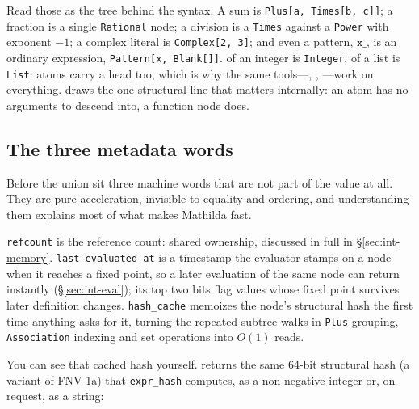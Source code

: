 
Read those as the tree behind the syntax. A sum is \texttt{Plus[a, Times[b, c]]}; a
fraction is a single \texttt{Rational} node; a division is a \texttt{Times} against a
\texttt{Power} with exponent \(-1\); a complex literal is \texttt{Complex[2, 3]}; and
even a pattern, \(\mathtt{x\_}\), is an ordinary expression,
\texttt{Pattern[x, Blank[]]}.  of an integer is \texttt{Integer}, of a list
is \texttt{List}: atoms carry a head too, which is why the same tools---,
, ---work on everything.  draws the one structural line
that matters internally: an atom has no arguments to descend into, a function node
does.

\subsection*{The three metadata words}

Before the union sit three machine words that are not part of the value at all. They
are pure acceleration, invisible to equality and ordering, and understanding them
explains most of what makes Mathilda fast.

\texttt{refcount} is the reference count: shared ownership, discussed in full in
\S\ref{sec:int-memory}. \texttt{last\_evaluated\_at} is a timestamp the evaluator
stamps on a node when it reaches a fixed point, so a later evaluation of the same
node can return instantly (\S\ref{sec:int-eval}); its top two bits flag values whose
fixed point survives later definition changes. \texttt{hash\_cache} memoizes the node's structural hash the
first time anything asks for it, turning the repeated subtree walks in \texttt{Plus}
grouping, \texttt{Association} indexing and set operations into
\(O(1)\) reads.

You can see that cached hash yourself.  returns
the same 64-bit structural hash (a variant of FNV-1a) that \texttt{expr\_hash} computes,
as a non-negative integer or, on request, as a string:

